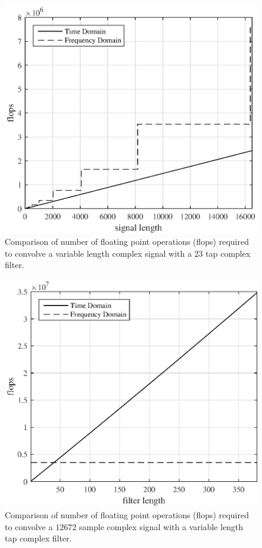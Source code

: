 \begin{figure}
	\centering\includegraphics[width=5in]{figures/gpu_intro/Theory21Tap_flops.eps}
	\caption{Comparison of number of floating point operations (flops) required to convolve a variable length complex signal with a $23$ tap complex filter.}
	\label{fig:Theory21Tap_flops}
\end{figure}
\begin{figure} 
	\centering\includegraphics[width=5in]{figures/gpu_intro/Theory12672signal_flops.eps}
	\caption{Comparison of number of floating point operations (flops) required to convolve a $12672$ sample complex signal with a variable length tap complex filter.}
	\label{fig:Theory12672signal_flops}
\end{figure}

